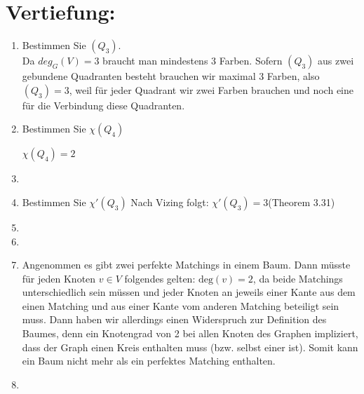 

\usepackage{ tipa }


    \maketitle
    \section*{Vertiefung:}
    \begin{enumerate}[label=(\alph*)]
        \item Bestimmen Sie \textchi$(Q_3 )$.\\
        Da $deg_G(V) = 3 $ braucht man mindestens 3 Farben. Sofern $(Q_3)$ aus zwei gebundene Quadranten besteht brauchen wir maximal 3 Farben, also \textchi$(Q_3) = 3$, weil für jeder Quadrant wir zwei Farben brauchen und noch eine für die Verbindung diese Quadranten.
                
        \item Bestimmen Sie $ \chi (Q_4) $
                
        $\chi (Q_4) = 2 $
                
        \item
               
        \item 
        Bestimmen Sie $\chi'(Q_3) $
        Nach Vizing folgt: $\chi'(Q_3) = 3 $(Theorem 3.31)
        
        \item
        
        \item  
        
        \item 
        Angenommen es gibt zwei perfekte Matchings in einem Baum. Dann müsste für jeden Knoten $v \in V$ folgendes gelten: $\textrm{deg}(v) = 2$, da beide Matchings unterschiedlich sein müssen und jeder Knoten an jeweils einer Kante aus dem einen Matching und aus einer Kante vom anderen Matching beteiligt sein muss. Dann haben wir allerdings einen Widerspruch zur Definition des Baumes, denn ein Knotengrad von 2 bei allen Knoten des Graphen impliziert, dass der Graph einen Kreis enthalten muss (bzw. selbst einer ist). Somit kann ein Baum nicht mehr als ein perfektes Matching enthalten. 
        \item 
        
    \end{enumerate}

